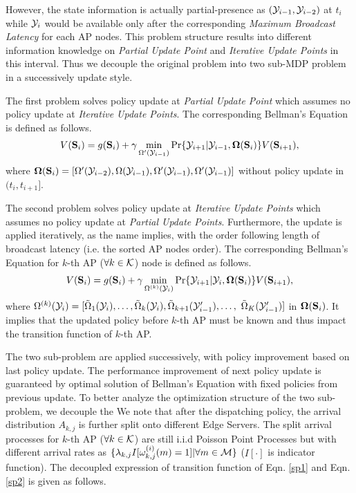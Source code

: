 However, the state information is actually partial-presence as $(\mathcal{Y}_{i-1}, \mathcal{Y}_{i-2})$ at $t_i$ while $\mathcal{Y}_{i}$ would be available only after the corresponding \emph{Maximum Broadcast Latency} for each AP nodes.
This problem structure results into different information knowledge on \emph{Partial Update Point} and \emph{Iterative Update Points} in this interval.
Thus we decouple the original problem into two sub-MDP problem in a successively update style.
        
The first problem solves policy update at \emph{Partial Update Point} which assumes no policy update at \emph{Iterative Update Points}. The corresponding Bellman's Equation is defined as follows.
\begin{align}
    V(\mathbf{S}_i) = g(\mathbf{S}_i) + \gamma \min_{\Omega'(\mathcal{Y}_{i-1})} \Pr\{ \mathcal{Y}_{i+1}|\mathcal{Y}_{i-1}, \boldsymbol{\Omega}(\mathbf{S}_i) \} V(\mathbf{S}_{i+1}),
    \label{sp1}
\end{align}
where $\boldsymbol{\Omega}(\mathbf{S}_i) = [\Omega'(\mathcal{Y}_{i-2}), \Omega(\mathcal{Y}_{i-1}), \Omega'(\mathcal{Y}_{i-1}), \Omega'(\mathcal{Y}_{i-1})]$ without policy update in $(t_i, t_{i+1}]$.
        
The second problem solves policy update at \emph{Iterative Update Points} which assumes no policy update at \emph{Partial Update Points}.
Furthermore, the update is applied iteratively, as the name implies, with the order following length of broadcast latency (i.e. the sorted AP nodes order). The corresponding Bellman's Equation for $k$-th AP ($\forall k\in\mathcal{K}$) node is defined as follows.
\begin{align}
    V(\mathbf{S}_i) = g(\mathbf{S}_i) + \gamma \min_{\Omega^{(k)}(\mathcal{Y}_{i})} \Pr\{ \mathcal{Y}_{i+1}|\mathcal{Y}_{i}, \boldsymbol{\Omega}(\mathbf{S}_i) \} V(\mathbf{S}_{i+1}),
    \label{sp2}
\end{align}
where $\Omega^{(k)}(\mathcal{Y}_{i}) = [\tilde{\Omega}_{1}(\mathcal{Y}_{i}), \dots, \tilde{\Omega}_{k}(\mathcal{Y}_{i}), \tilde{\Omega}_{k+1}(\mathcal{Y}'_{i-1}), \dots, $ $\tilde{\Omega}_{K}(\mathcal{Y}'_{i-1})]$ in $\boldsymbol{\Omega}(\mathbf{S}_i)$.
It implies that the updated policy before $k$-th AP must be known and thus impact the transition function of $k$-th AP.
        
The two sub-problem are applied successively, with policy improvement based on last policy update. The performance improvement of next policy update is guaranteed by optimal solution of Bellman's Equation with fixed policies from previous update.
To better analyze the optimization structure of the two sub-problem, we decouple the 
We note that after the dispatching policy, the arrival distribution $A_{k,j}$ is further split onto different Edge Servers. The split arrival processes for $k$-th AP ($\forall k\in\mathcal{K}$) are still i.i.d Poisson Point Processes but with different arrival rates as $\{\lambda_{k,j}I[\omega^{(i)}_{k,j}(m)=1]|\forall m\in\mathcal{M}\}$ ($I[\cdot]$ is indicator function). The decoupled expression of transition function of Eqn. \ref{sp1} and Eqn. \ref{sp2} is given as follows.
        
